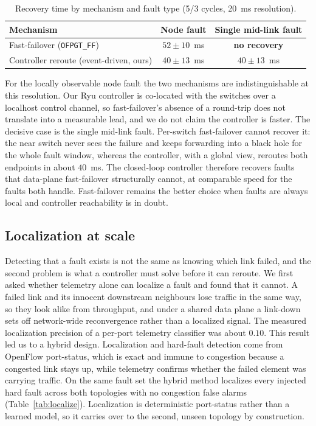 \documentclass[conference]{IEEEtran}
\begin{document}
\begin{table}[t]
\caption{Recovery time by mechanism and fault type (5/3 cycles, 20~ms resolution).}
\label{tab:recovery}
\centering
\begin{tabular}{lcc}
\toprule
Mechanism & Node fault & Single mid-link fault \\
\midrule
Fast-failover (\texttt{OFPGT\_FF}) & $52\pm10$~ms & \textbf{no recovery} \\
Controller reroute (event-driven, ours) & $40\pm13$~ms & $40\pm13$~ms \\
\bottomrule
\end{tabular}
\end{table}

For the locally observable node fault the two mechanisms are indistinguishable at
this resolution. Our Ryu controller is co-located with the switches over a localhost
control channel, so fast-failover's absence of a round-trip does not translate into a
measurable lead, and we do not claim the controller is faster. The decisive case is
the single mid-link fault. Per-switch fast-failover cannot recover it: the near
switch never sees the failure and keeps forwarding into a black hole for the whole
fault window, whereas the controller, with a global view, reroutes both endpoints in
about $40$~ms. The closed-loop controller therefore recovers faults that data-plane
fast-failover structurally cannot, at comparable speed for the faults both handle.
Fast-failover remains the better choice when faults are always local and controller
reachability is in doubt.

\subsection{Localization at scale}
\label{sec:detect-scale}
Detecting that a fault exists is not the same as knowing which link failed, and the
second problem is what a controller must solve before it can reroute. We first asked
whether telemetry alone can localize a fault and found that it cannot. A failed link
and its innocent downstream neighbours lose traffic in the same way, so they look
alike from throughput, and under a shared data plane a link-down sets off
network-wide reconvergence rather than a localized signal. The measured localization
precision of a per-port telemetry classifier was about $0.10$.
This result led us to a hybrid design. Localization and hard-fault detection come
from OpenFlow port-status, which is exact and immune to congestion because a
congested link stays up, while telemetry confirms whether the failed element was
carrying traffic. On the same fault set the hybrid method localizes every injected
hard fault across both topologies with no congestion false alarms
(Table~\ref{tab:localize}). Localization is deterministic port-status rather than a
learned model, so it carries over to the second, unseen topology by construction.
\end{document}
